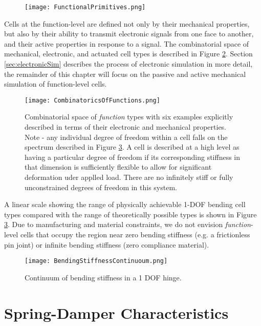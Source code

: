 {\begin{figure}
  \texttt{[image: FunctionalPrimitives.png]}
  \caption{}
  \label{fig:FunctionalPrimitives}
\end{figure}


Cells at the function-level are defined not only by their mechanical properties, but also by their ability to transmit electronic signals from one face to another, and their active properties in response to a signal. The combinatorial space of mechanical, electronic, and actuated cell types is described in Figure \ref{fig:CombinatoricsOfFunctions}.  Section \ref{sec:electronicSim} describes the process of electronic simulation in more detail, the remainder of this chapter will focus on the passive and active mechanical simulation of function-level cells.
\\

\begin{figure}
  \texttt{[image: CombinatoricsOfFunctions.png]}
  \caption{Combinatorial space of \textit{function} types with six examples explicitly described in terms of their electronic and mechanical properties.  Note - any individual degree of freedom within a cell falls on the spectrum described in Figure \ref{fig:BendingStiffnessContinuoum}.  A cell is described at a high level as having a particular degree of freedom if its corresponding stiffness in that dimension is sufficiently flexible to allow for significant deformation uder applled load.  There are no infinitely stiff or fully unconstrained degrees of freedom in this system.}
  \label{fig:CombinatoricsOfFunctions}
\end{figure}

A linear scale showing the range of physically achievable 1-DOF bending cell types compared with the range of theoretically possible types is shown in Figure \ref{fig:BendingStiffnessContinuoum}.  Due to manufacturing and material constraints, we do not envision \textit{function}-level cells that occupy the region near zero bending stiffness (e.g. a frictionless pin joint) or infinite bending stiffness (zero compliance material).

\begin{figure}
  \texttt{[image: BendingStiffnessContinuoum.png]}
  \caption{Continuum of bending stiffness in a 1 DOF hinge.}
  \label{fig:BendingStiffnessContinuoum}
\end{figure}

\section{Spring-Damper Characteristics}

}
